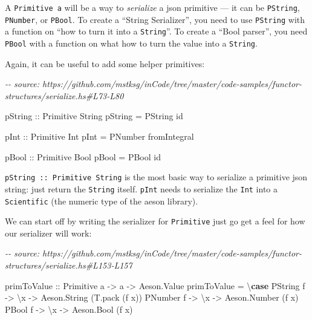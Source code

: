 \documentclass[]{article}
\newenvironment{Shaded}{}{}
\newcommand{\CommentTok}[1]{\textcolor[rgb]{0.38,0.63,0.69}{\textit{#1}}}
\newcommand{\DataTypeTok}[1]{\textcolor[rgb]{0.56,0.13,0.00}{#1}}
\newcommand{\FunctionTok}[1]{\textcolor[rgb]{0.02,0.16,0.49}{#1}}
\newcommand{\KeywordTok}[1]{\textcolor[rgb]{0.00,0.44,0.13}{\textbf{#1}}}
\newcommand{\NormalTok}[1]{#1}
\newcommand{\OtherTok}[1]{\textcolor[rgb]{0.00,0.44,0.13}{#1}}
\begin{document}
A \texttt{Primitive\ a} will be a way to \emph{serialize} a json primitive ---
it can be \texttt{PString}, \texttt{PNumber}, or \texttt{PBool}. To create a
``String Serializer'', you need to use \texttt{PString} with a function on ``how
to turn it into a \texttt{String}''. To create a ``Bool parser'', you need
\texttt{PBool} with a function on what how to turn the value into a
\texttt{String}.

Again, it can be useful to add some helper primitives:

\begin{Shaded}
\begin{Highlighting}[]
\CommentTok{{-}{-} source: https://github.com/mstksg/inCode/tree/master/code{-}samples/functor{-}structures/serialize.hs\#L73{-}L80}

\OtherTok{pString ::} \DataTypeTok{Primitive} \DataTypeTok{String}
\NormalTok{pString }\OtherTok{=} \DataTypeTok{PString} \FunctionTok{id}

\OtherTok{pInt ::} \DataTypeTok{Primitive} \DataTypeTok{Int}
\NormalTok{pInt }\OtherTok{=} \DataTypeTok{PNumber} \FunctionTok{fromIntegral}

\OtherTok{pBool ::} \DataTypeTok{Primitive} \DataTypeTok{Bool}
\NormalTok{pBool }\OtherTok{=} \DataTypeTok{PBool} \FunctionTok{id}
\end{Highlighting}
\end{Shaded}

\texttt{pString\ ::\ Primitive\ String} is the most basic way to serialize a
primitive json string: just return the \texttt{String} itself. \texttt{pInt}
needs to serialize the \texttt{Int} into a \texttt{Scientific} (the numeric type
of the aeson library).

We can start off by writing the serializer for \texttt{Primitive} just go get a
feel for how our serializer will work:

\begin{Shaded}
\begin{Highlighting}[]
\CommentTok{{-}{-} source: https://github.com/mstksg/inCode/tree/master/code{-}samples/functor{-}structures/serialize.hs\#L153{-}L157}

\OtherTok{primToValue ::} \DataTypeTok{Primitive}\NormalTok{ a }\OtherTok{{-}>}\NormalTok{ a }\OtherTok{{-}>} \DataTypeTok{Aeson.Value}
\NormalTok{primToValue }\OtherTok{=}\NormalTok{ \textbackslash{}}\KeywordTok{case}
  \DataTypeTok{PString}\NormalTok{ f }\OtherTok{{-}>}\NormalTok{ \textbackslash{}x }\OtherTok{{-}>} \DataTypeTok{Aeson.String}\NormalTok{ (T.pack (f x))}
  \DataTypeTok{PNumber}\NormalTok{ f }\OtherTok{{-}>}\NormalTok{ \textbackslash{}x }\OtherTok{{-}>} \DataTypeTok{Aeson.Number}\NormalTok{ (f x)}
  \DataTypeTok{PBool}\NormalTok{   f }\OtherTok{{-}>}\NormalTok{ \textbackslash{}x }\OtherTok{{-}>} \DataTypeTok{Aeson.Bool}\NormalTok{   (f x)}
\end{Highlighting}
\end{Shaded}
\end{document}
